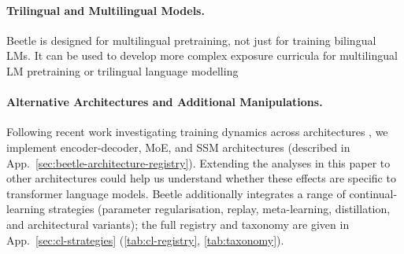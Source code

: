 \documentclass[11pt]{article}
\newcommand{\beetle}{Beetle} %
\begin{document}
\paragraph{Trilingual and Multilingual Models.} \beetle{} is designed for multilingual pretraining, not just for training bilingual LMs. It can be used to develop more complex exposure curricula for multilingual LM pretraining or trilingual language modelling

\paragraph{Alternative Architectures and Additional Manipulations.} Following recent work investigating training dynamics across architectures \citep{michaelov2025language}, we implement encoder-decoder, MoE, and SSM architectures (described in App.~\ref{sec:beetle-architecture-registry}). Extending the analyses in this paper to other architectures could help us understand whether these effects are specific to transformer language models. \beetle{} additionally integrates a range of continual-learning strategies (parameter regularisation, replay, meta-learning, distillation, and architectural variants); the full registry and taxonomy are given in App.~\ref{sec:cl-strategies} (\autoref{tab:cl-registry}, \autoref{tab:taxonomy}). %

\end{document}

